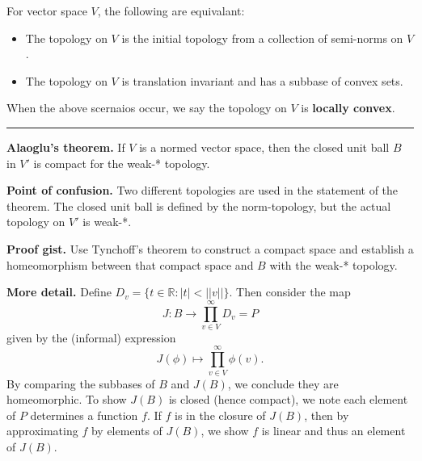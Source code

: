 \documentclass[12pt, letterpaper]{article}
\newcommand{\bR}{{\mathbb R}}
\renewcommand{\i}{\infty}
\begin{document}
For vector space $V$, the following are equivalant:
\begin{itemize}
    \item The topology on $V$ is the initial topology from a collection of semi-norms on $V$.

    \item The topology on $V$ is translation invariant and has a subbase of convex sets.
\end{itemize}
When the above scernaios occur, we say the topology on $V$ is \textbf{locally convex}.

\noindent\rule{\textwidth}{1pt}

\textbf{Alaoglu's theorem.} If $V$ is a normed vector space, then the closed unit ball $B$ in $V'$ is compact for the weak-* topology.

\textbf{Point of confusion.} Two different topologies are used in the statement of the theorem. The closed unit ball is defined by the norm-topology, but the actual topology on $V'$ is weak-*.

\textbf{Proof gist.} Use Tynchoff's theorem to construct a compact space and establish a homeomorphism between that compact space and $B$ with the weak-* topology.

\textbf{More detail.} Define $D_v = \{t \in \bR: |t| < ||v|| \}$. Then consider the map
\[
    J: B \rightarrow \prod^{\i}_{v \in V}D_v = P
\]
given by the (informal) expression
\[
    J(\phi) \mapsto \prod^{\i}_{v \in V}\phi(v).
\]
By comparing the subbases of $B$ and $J(B)$, we conclude they are homeomorphic. To show $J(B)$ is closed (hence compact), we note each element of $P$ determines a function $f$. If $f$ is in the closure of $J(B)$, then by approximating $f$ by elements of $J(B)$, we show $f$ is linear and thus an element of $J(B)$. 
\end{document}
